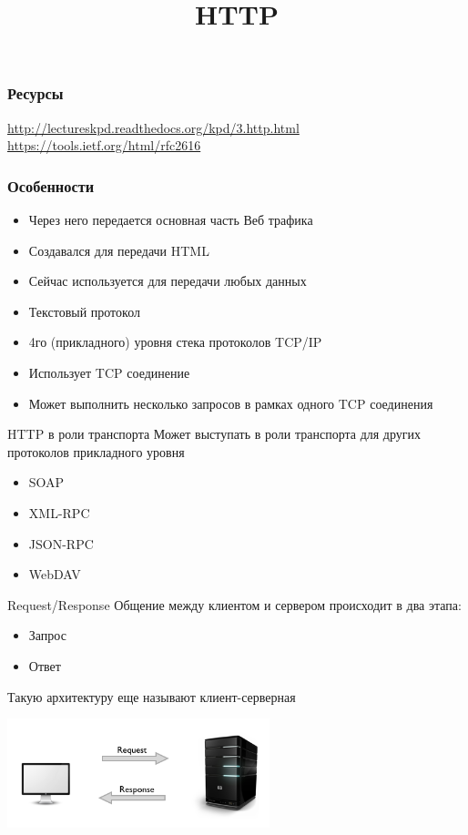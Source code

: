 

\title{HTTP}



\frame{\titlepage}

\begin{frame}
    \frametitle{Ресурсы}
    \url{http://lectureskpd.readthedocs.org/kpd/3.http.html}
    \url{https://tools.ietf.org/html/rfc2616}
\end{frame}

\begin{frame}
    \frametitle{Особенности}
    \begin{itemize}
        \item Через него передается основная часть Веб трафика
        \item Создавался для передачи HTML
        \item Сейчас используется для передачи любых данных
        \item Текстовый протокол
        \item 4го (прикладного) уровня стека протоколов TCP/IP
        \item Использует TCP соединение
        \item Может выполнить несколько запросов в рамках одного TCP соединения
    \end{itemize}
\end{frame}

\begin{frame}{HTTP в роли транспорта}
    Может выступать в роли транспорта для других протоколов прикладного уровня
    \begin{itemize}
        \item SOAP
        \item XML-RPC
        \item JSON-RPC
        \item WebDAV
    \end{itemize}
\end{frame}

\begin{frame}{Request/Response}
    Общение между клиентом и сервером происходит в два этапа:
    \begin{itemize}
        \item Запрос
        \item Ответ
    \end{itemize}
    Такую архитектуру еще называют клиент-серверная
    \begin{center}
        \includegraphics[width=3in]{media/client-server.png}
    \end{center}
\end{frame}

